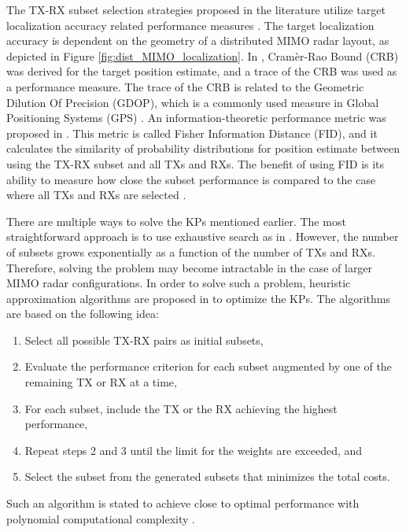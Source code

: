 \documentclass[english, 12pt, a4paper, elec, utf8, a-1b, online]{aaltothesis}
\begin{document}
The TX-RX subset selection strategies proposed in the literature utilize target localization accuracy related performance measures \cite{Godrich2011a, Godrich2011, Sun2014}.
The target localization accuracy is dependent on the geometry of a distributed MIMO radar layout, as depicted in Figure \ref{fig:dist_MIMO_localization}.
In \cite{Godrich2011a, Godrich2011}, Cram\`er-Rao Bound (CRB) was derived for the target position estimate, and a trace of the CRB was used as a performance measure.
The trace of the CRB is related to the Geometric Dilution Of Precision (GDOP), which is a commonly used measure in Global Positioning Systems (GPS) \cite{Sun2014}. 
An information-theoretic performance metric was proposed in \cite{Sun2014}.
This metric is called Fisher Information Distance (FID), and it calculates the similarity of probability distributions for position estimate between using the TX-RX subset and all TXs and RXs.
The benefit of using FID is its ability to measure how close the subset performance is compared to the case where all TXs and RXs are selected \cite{Sun2014}.

There are multiple ways to solve the KPs mentioned earlier.
The most straightforward approach is to use exhaustive search as in \cite{Sun2014}.
However, the number of subsets grows exponentially as a function of the number of TXs and RXs.
Therefore, solving the problem may become intractable in the case of larger MIMO radar configurations.
In order to solve such a problem, heuristic approximation algorithms are proposed in \cite{Godrich2011a, Godrich2011} to optimize the KPs.
The algorithms are based on the following idea:
\begin{enumerate}
    \item Select all possible TX-RX pairs as initial subsets,
    \item Evaluate the performance criterion for each subset augmented by one of the remaining TX or RX at a time, 
    \item For each subset, include the TX or the RX achieving the highest performance,
    \item Repeat steps 2 and 3 until the limit for the weights are exceeded, and
    \item Select the subset from the generated subsets that minimizes the total costs. 
\end{enumerate}
Such an algorithm is stated to achieve close to optimal performance with polynomial computational complexity \cite{Godrich2011a, Godrich2011}.
\end{document}

